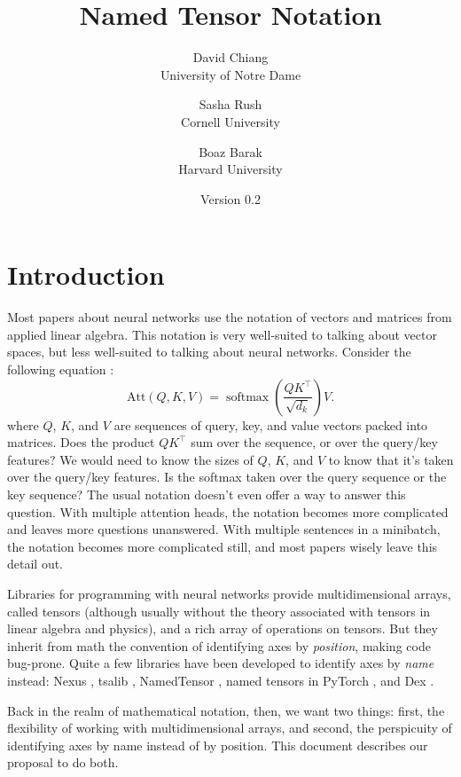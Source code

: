 \documentclass{article}
\title{\bf Named Tensor Notation}
\author{David Chiang \\ \small University of Notre Dame \and Sasha Rush \\ \small Cornell University \and Boaz Barak \\ \small Harvard University}
\date{Version 0.2}
\DeclareMathOperator*{\softmax}{softmax}
\begin{document}
\maketitle

\setcounter{tocdepth}{2}
\tableofcontents

\clearpage

\section{Introduction}
\label{sec:intro}

Most papers about neural networks use the notation of vectors and matrices from applied linear algebra. This notation is very well-suited to talking about vector spaces, but less well-suited to talking about neural networks. Consider the following equation \citep{vaswani+:2017}:
\[ \text{Att}(Q, K, V) = \softmax \left( \frac{QK^\top}{\sqrt{d_k}} \right) V. \]
where $Q$, $K$, and $V$ are sequences of query, key, and value vectors packed into matrices. Does the product $QK^\top$ sum over the sequence, or over the query/key features? We would need to know the sizes of $Q$, $K$, and $V$ to know that it's taken over the query/key features. Is the softmax taken over the query sequence or the key sequence? The usual notation doesn't even offer a way to answer this question. With multiple attention heads, the notation becomes more complicated and leaves more questions unanswered. With multiple sentences in a minibatch, the notation becomes more complicated still, and most papers wisely leave this detail out.

Libraries for programming with neural networks \citep{numpy,pytorch} provide multidimensional arrays, called tensors (although usually without the theory associated with tensors in linear algebra and physics), and a rich array of operations on tensors. But they inherit from math the convention of identifying axes by \emph{position}, making code bug-prone. Quite a few libraries have been developed to identify axes by \emph{name} instead: Nexus \citep{chen2017typesafe}, tsalib \citep{tsalib}, NamedTensor \citep{namedtensor}, named tensors in PyTorch \citep{named-tensors}, and Dex \citep{maclaurin+:2019}.

Back in the realm of mathematical notation, then, we want two things: first, the flexibility of working with multidimensional arrays, and second, the perspicuity of identifying axes by name instead of by position. This document describes our proposal to do both.
\end{document}
